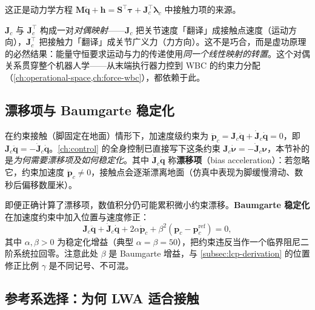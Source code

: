 \noindent 这正是动力学方程 $\mathbf{M}\ddot{\boldsymbol{q}}+\boldsymbol{h}=\mathbf{S}^\top\boldsymbol{\tau}+\mathbf{J}_c^\top\boldsymbol{\lambda}_c$ 中接触力项的来源。

\begin{insight}[运动与力共用同一映射的转置]
$\mathbf{J}_c$ 与 $\mathbf{J}_c^\top$ 构成一对\emph{对偶映射}——$\mathbf{J}_c$ 把关节速度「翻译」成接触点速度（运动方向），$\mathbf{J}_c^\top$ 把接触力「翻译」成关节广义力（力方向）。这不是巧合，而是虚功原理的必然结果：能量守恒要求运动与力的传递使用\emph{同一个线性映射的转置}。这个对偶关系贯穿整个机器人学——从末端执行器力控到 WBC 的约束力分配（\cref{ch:operational-space,ch:force-wbc}），都依赖于此。
\end{insight}

\subsection{漂移项与 Baumgarte 稳定化}
\label{subsec:jacobian-drift}

在约束接触（脚固定在地面）情形下，加速度级约束为 $\ddot{\boldsymbol{p}}_c=\mathbf{J}_c\ddot{\boldsymbol{q}}+\dot{\mathbf{J}}_c\dot{\boldsymbol{q}}=0$，即 $\mathbf{J}_c\ddot{\boldsymbol{q}}=-\dot{\mathbf{J}}_c\dot{\boldsymbol{q}}$。\cref{ch:control} 的全身控制已直接写下这条约束 $\mathbf{J}_c\dot{\boldsymbol{\nu}}=-\dot{\mathbf{J}}_c\boldsymbol{\nu}$，本节补的是\emph{为何需要漂移项及如何稳定化}。其中 $\dot{\mathbf{J}}_c\dot{\boldsymbol{q}}$ 称\textbf{漂移项}（bias acceleration）：若忽略它，约束加速度 $\ddot{\boldsymbol{p}}_c\neq0$，接触点会逐渐漂离地面（仿真中表现为脚缓慢滑动、数秒后偏移数厘米）。

即便正确计算了漂移项，数值积分仍可能累积微小约束漂移。\textbf{Baumgarte 稳定化}在加速度约束中加入位置与速度修正：
\begin{equation}
  \mathbf{J}_c\ddot{\boldsymbol{q}}+\dot{\mathbf{J}}_c\dot{\boldsymbol{q}}+2\alpha\dot{\boldsymbol{p}}_c+\beta^2(\boldsymbol{p}_c-\boldsymbol{p}_c^{\mathrm{ref}})=0,
  \label{eq:baumgarte}
\end{equation}
其中 $\alpha,\beta>0$ 为稳定化增益（典型 $\alpha=\beta=50$），把约束违反当作一个临界阻尼二阶系统拉回零。注意此处 $\beta$ 是 Baumgarte 增益，与 \cref{subsec:lcp-derivation} 的位置修正比例 $\gamma$ 是不同记号、不可混。

\subsection{参考系选择：为何 LWA 适合接触}
\label{subsec:jacobian-frame}

